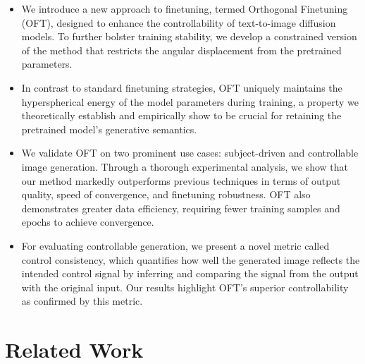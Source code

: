 \begin{itemize}[leftmargin=*,nosep]

    \item We introduce a new approach to finetuning, termed Orthogonal Finetuning (OFT), designed to enhance the controllability of text-to-image diffusion models. To further bolster training stability, we develop a constrained version of the method that restricts the angular displacement from the pretrained parameters.
    \item In contrast to standard finetuning strategies, OFT uniquely maintains the hyperspherical energy of the model parameters during training, a property we theoretically establish and empirically show to be crucial for retaining the pretrained model’s generative semantics.
    \item We validate OFT on two prominent use cases: subject-driven and controllable image generation. Through a thorough experimental analysis, we show that our method markedly outperforms previous techniques in terms of output quality, speed of convergence, and finetuning robustness. OFT also demonstrates greater data efficiency, requiring fewer training samples and epochs to achieve convergence.
    \item For evaluating controllable generation, we present a novel metric called control consistency, which quantifies how well the generated image reflects the intended control signal by inferring and comparing the signal from the output with the original input. Our results highlight OFT’s superior controllability as confirmed by this metric.
\end{itemize}

\section{Related Work}

